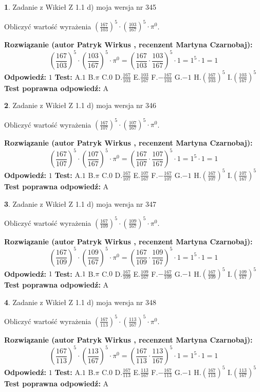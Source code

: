 \documentclass[12pt, a4paper]{article}
\theoremstyle{definition} %
\newtheorem{zad}{}
\newcommand{\zadStart}[1]{\begin{zad}#1\newline}
\newcommand{\zadStop}{\end{zad}}
\newcommand{\rozwStart}[2]{\noindent \textbf{Rozwiązanie (autor #1 , recenzent #2): }\newline}
\newcommand{\rozwStop}{\newline}
\newcommand{\odpStart}{\noindent \textbf{Odpowiedź:}\newline}
\newcommand{\odpStop}{\newline}
\newcommand{\testStart}{\noindent \textbf{Test:}\newline}
\newcommand{\testStop}{\newline}
\newcommand{\kluczStart}{\noindent \textbf{Test poprawna odpowiedź:}\newline}
\newcommand{\kluczStop}{\newline}
\begin{document}
\zadStart{Zadanie z Wikieł Z 1.1 d) moja wersja nr 345}

Obliczyć wartość wyrażenia $(\frac{167}{103})^{5} \cdot (\frac{103}{167})^{5} \cdot \pi^{0}$.
\zadStop
\rozwStart{Patryk Wirkus}{Martyna Czarnobaj}
$$(\frac{167}{103})^{5} \cdot (\frac{103}{167})^{5} \cdot \pi^{0} = (\frac{167}{103} \cdot \frac{103}{167})^{5} \cdot 1 = 1^{5} \cdot 1 = 1$$
\rozwStop
\odpStart
$1$
\odpStop
\testStart
A.$1$ B.$\pi$ C.$0$ D.$\frac{167}{103}$ E.$\frac{103}{167}$
F.$-\frac{167}{103}$ G.$-1$
H.$(\frac{167}{103})^{5}$
I.$(\frac{103}{167})^{5}$
\testStop
\kluczStart
A
\kluczStop



\zadStart{Zadanie z Wikieł Z 1.1 d) moja wersja nr 346}

Obliczyć wartość wyrażenia $(\frac{167}{107})^{5} \cdot (\frac{107}{167})^{5} \cdot \pi^{0}$.
\zadStop
\rozwStart{Patryk Wirkus}{Martyna Czarnobaj}
$$(\frac{167}{107})^{5} \cdot (\frac{107}{167})^{5} \cdot \pi^{0} = (\frac{167}{107} \cdot \frac{107}{167})^{5} \cdot 1 = 1^{5} \cdot 1 = 1$$
\rozwStop
\odpStart
$1$
\odpStop
\testStart
A.$1$ B.$\pi$ C.$0$ D.$\frac{167}{107}$ E.$\frac{107}{167}$
F.$-\frac{167}{107}$ G.$-1$
H.$(\frac{167}{107})^{5}$
I.$(\frac{107}{167})^{5}$
\testStop
\kluczStart
A
\kluczStop



\zadStart{Zadanie z Wikieł Z 1.1 d) moja wersja nr 347}

Obliczyć wartość wyrażenia $(\frac{167}{109})^{5} \cdot (\frac{109}{167})^{5} \cdot \pi^{0}$.
\zadStop
\rozwStart{Patryk Wirkus}{Martyna Czarnobaj}
$$(\frac{167}{109})^{5} \cdot (\frac{109}{167})^{5} \cdot \pi^{0} = (\frac{167}{109} \cdot \frac{109}{167})^{5} \cdot 1 = 1^{5} \cdot 1 = 1$$
\rozwStop
\odpStart
$1$
\odpStop
\testStart
A.$1$ B.$\pi$ C.$0$ D.$\frac{167}{109}$ E.$\frac{109}{167}$
F.$-\frac{167}{109}$ G.$-1$
H.$(\frac{167}{109})^{5}$
I.$(\frac{109}{167})^{5}$
\testStop
\kluczStart
A
\kluczStop



\zadStart{Zadanie z Wikieł Z 1.1 d) moja wersja nr 348}

Obliczyć wartość wyrażenia $(\frac{167}{113})^{5} \cdot (\frac{113}{167})^{5} \cdot \pi^{0}$.
\zadStop
\rozwStart{Patryk Wirkus}{Martyna Czarnobaj}
$$(\frac{167}{113})^{5} \cdot (\frac{113}{167})^{5} \cdot \pi^{0} = (\frac{167}{113} \cdot \frac{113}{167})^{5} \cdot 1 = 1^{5} \cdot 1 = 1$$
\rozwStop
\odpStart
$1$
\odpStop
\testStart
A.$1$ B.$\pi$ C.$0$ D.$\frac{167}{113}$ E.$\frac{113}{167}$
F.$-\frac{167}{113}$ G.$-1$
H.$(\frac{167}{113})^{5}$
I.$(\frac{113}{167})^{5}$
\testStop
\kluczStart
A
\kluczStop
\end{document}
